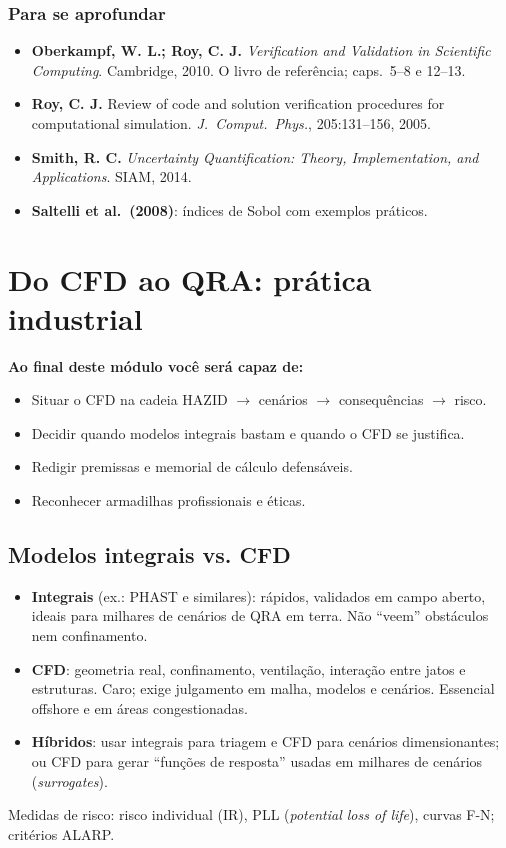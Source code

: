 \documentclass[10pt,a4paper,twocolumn,openany]{report}
\newenvironment{conceito}[1]{\section{#1}}{\par}
\newenvironment{aprofundar}{\subsection*{\textcolor{amarelo}{Para se aprofundar}}\small}{\par}
\newcommand{\objetivos}{\noindent\textbf{Ao final deste módulo você será capaz de:}}
\begin{document}
\begin{aprofundar}
\begin{itemize}[leftmargin=*]
  \item \textbf{Oberkampf, W. L.; Roy, C. J.} \emph{Verification and Validation in Scientific Computing}. Cambridge, 2010. O livro de referência; caps.\ 5--8 e 12--13.
  \item \textbf{Roy, C. J.} Review of code and solution verification procedures for computational simulation. \emph{J.\ Comput.\ Phys.}, 205:131--156, 2005.
  \item \textbf{Smith, R. C.} \emph{Uncertainty Quantification: Theory, Implementation, and Applications}. SIAM, 2014.
  \item \textbf{Saltelli et al.\ (2008)}: índices de Sobol com exemplos práticos.
\end{itemize}
\end{aprofundar}

\chapter{Do CFD ao QRA: prática industrial}

\objetivos
\begin{itemize}
  \item Situar o CFD na cadeia HAZID $\rightarrow$ cenários $\rightarrow$
        consequências $\rightarrow$ risco.
  \item Decidir quando modelos integrais bastam e quando o CFD se justifica.
  \item Redigir premissas e memorial de cálculo defensáveis.
  \item Reconhecer armadilhas profissionais e éticas.
\end{itemize}

\begin{conceito}{Modelos integrais vs. CFD}
\begin{itemize}
  \item \textbf{Integrais} (ex.: PHAST e similares): rápidos, validados em
        campo aberto, ideais para milhares de cenários de QRA em terra.
        Não ``veem'' obstáculos nem confinamento.
  \item \textbf{CFD}: geometria real, confinamento, ventilação, interação
        entre jatos e estruturas. Caro; exige julgamento em malha, modelos e
        cenários. Essencial offshore e em áreas congestionadas.
  \item \textbf{Híbridos}: usar integrais para triagem e CFD para cenários
        dimensionantes; ou CFD para gerar ``funções de resposta'' usadas
        em milhares de cenários (\emph{surrogates}).
\end{itemize}
Medidas de risco: risco individual (IR), PLL (\emph{potential loss of life}),
curvas F-N; critérios ALARP.
\end{conceito}
\end{document}
